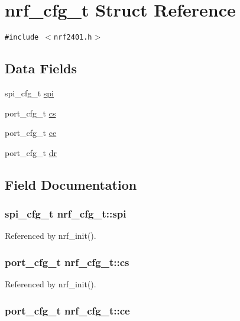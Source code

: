 \hypertarget{structnrf__cfg__t}{
\section{nrf\_\-cfg\_\-t Struct Reference}
\label{structnrf__cfg__t}
}
{\tt \#include $<$nrf2401.h$>$}

\subsection*{Data Fields}
\begin{CompactItemize}
\item 
spi\_\-cfg\_\-t \hyperlink{structnrf__cfg__t_259bc50156c77048c233f643821f54a7}{spi}
\item 
port\_\-cfg\_\-t \hyperlink{structnrf__cfg__t_d84f5da838c1638ccdbd0abfc9aaf704}{cs}
\item 
port\_\-cfg\_\-t \hyperlink{structnrf__cfg__t_485e38da7e59506b976e070beb174637}{ce}
\item 
port\_\-cfg\_\-t \hyperlink{structnrf__cfg__t_64ed9f1b204e8c3e768d93bb0f0aa6ba}{dr}
\end{CompactItemize}


\subsection{Field Documentation}
\hypertarget{structnrf__cfg__t_259bc50156c77048c233f643821f54a7}{
\subsubsection{\setlength{\rightskip}{0pt plus 5cm}spi\_\-cfg\_\-t {\bf nrf\_\-cfg\_\-t::spi}}}
\label{structnrf__cfg__t_259bc50156c77048c233f643821f54a7}




Referenced by nrf\_\-init().\hypertarget{structnrf__cfg__t_d84f5da838c1638ccdbd0abfc9aaf704}{
\subsubsection{\setlength{\rightskip}{0pt plus 5cm}port\_\-cfg\_\-t {\bf nrf\_\-cfg\_\-t::cs}}}
\label{structnrf__cfg__t_d84f5da838c1638ccdbd0abfc9aaf704}




Referenced by nrf\_\-init().\hypertarget{structnrf__cfg__t_485e38da7e59506b976e070beb174637}{
\subsubsection{\setlength{\rightskip}{0pt plus 5cm}port\_\-cfg\_\-t {\bf nrf\_\-cfg\_\-t::ce}}}
\label{structnrf__cfg__t_485e38da7e59506b976e070beb174637}




